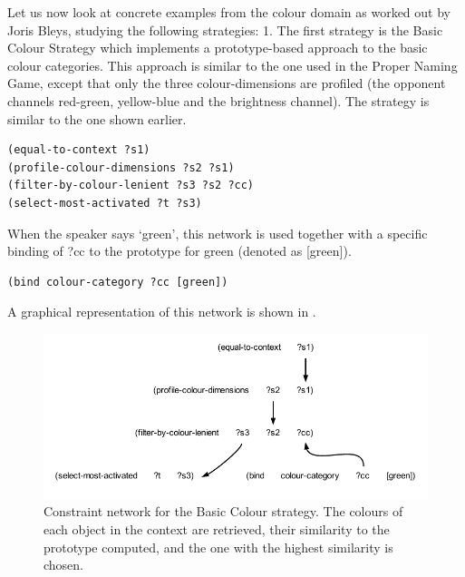Let us now look at concrete examples from the colour domain as worked out by Joris Bleys, studying the following 
strategies: 
\enlargethispage{1\baselineskip}
1. The first strategy is the {\bfshape Basic Colour Strategy} which implements a prototype-based approach to 
the basic colour categories. This approach is similar to the one used in the Proper Naming Game, except that 
only the three colour-dimensions are profiled (the opponent channels red-green, yellow-blue and the brightness channel). 
The strategy is similar to the one shown earlier. 
\begin{verbatim}
(equal-to-context ?s1) 
(profile-colour-dimensions ?s2 ?s1)
(filter-by-colour-lenient ?s3 ?s2 ?cc)
(select-most-activated ?t ?s3)
\end{verbatim}
When the speaker says `green', this network is used together with a specific binding of ?cc to the prototype for 
green (denoted as [green]). 
\begin{verbatim}
(bind colour-category ?cc [green])
\end{verbatim}
A graphical representation of this network is shown in . 

\begin{figure}[htbp]
  \centerline{\includegraphics[width=1.0\textwidth]{chap11/figs/basic-strat.pdf}}
\caption{\label{fig:basic-strat}Constraint network for the Basic Colour strategy. The colours of each object in the context are retrieved, their 
similarity to the prototype computed, and the one with the highest similarity is chosen.}
\end{figure}

